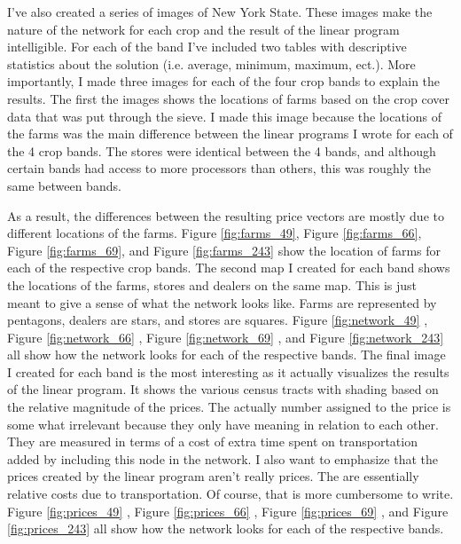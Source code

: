 \documentclass{report}
\begin{document}
I've also created a series of images of New York State. These images make the nature of the network for each crop and the result of the linear program intelligible. For each of the band I've included two tables with descriptive statistics about the solution (i.e. average, minimum, maximum, ect.). More importantly, I made three images for each of the four crop bands to explain the results. The first the images shows the locations of farms based on the crop cover data that was put through the sieve. I made this image because the locations of the farms was the main difference between the linear programs I wrote for each of the 4 crop bands. The stores were identical between the 4 bands, and although certain bands had access to more processors than others, this was roughly the same between bands.

 As a result, the differences between the resulting price vectors are mostly due to different locations of the farms. Figure \ref{fig:farms_49}, Figure \ref{fig:farms_66}, Figure \ref{fig:farms_69}, and Figure \ref{fig:farms_243} show the location of farms for each of the respective crop bands. The second map I created for each band shows the locations of the farms, stores and dealers on the same map. This is just meant to give a sense of what the network looks like. Farms are represented by pentagons, dealers are stars, and stores are squares. Figure \ref{fig:network_49} , Figure \ref{fig:network_66} , Figure \ref{fig:network_69} , and Figure \ref{fig:network_243} all show how the network looks for each of the respective bands. The final image I created for each band is the most interesting as it actually visualizes the results of the linear program. It shows the various census tracts with shading based on the relative magnitude of the prices. The actually number assigned to the price is some what irrelevant because they only have meaning in relation to each other. They are measured in terms of a cost of extra time spent on transportation added by including this node in the network. I also want to emphasize that the prices created by the linear program aren't really prices. The are essentially relative costs due to transportation. Of course, that is more cumbersome to write. Figure \ref{fig:prices_49} , Figure \ref{fig:prices_66} , Figure \ref{fig:prices_69} , and Figure \ref{fig:prices_243} all show how the network looks for each of the respective bands.
\end{document}

